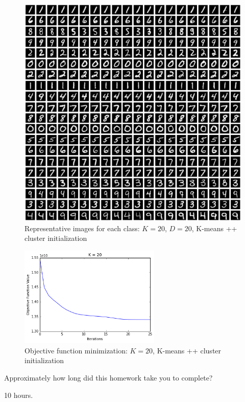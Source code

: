 \documentclass[submit]{harvardml}
\begin{document}
\begin{figure}
	\centering
	\includegraphics[width=1.0\textwidth]{output_8_1.png}
	\caption{Representative images for each class: $K = 20$, $D = 20$, K-means ++ cluster initialization }
\end{figure}

\begin{figure}
	\centering
	\includegraphics[width=0.6\textwidth]{output_9_0.png}
	\caption{Objective function minimization: $K = 20$, K-means ++ cluster initialization }
\end{figure}



\clearpage
\begin{problem}[Calibration, 1pt]
Approximately how long did this homework take you to complete?
\end{problem}

10 hours.
\end{document}
